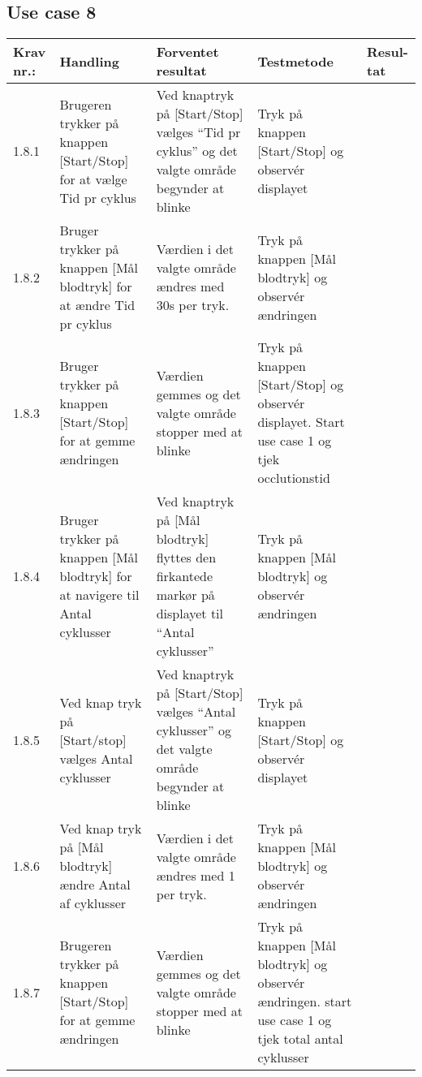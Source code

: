 \documentclass[11pt]{article}
\begin{document}
					\subsection{Use case 8}
					\begin{center}
						\begin{longtable}{|p{1.5cm}|p{2cm}|p{3cm}|p{3cm}|p{1.1cm}|}
							\hline
							Krav nr.: & Handling & Forventet resultat & Testmetode & Resul-tat  \\\hline
							1.8.1 & Brugeren trykker på knappen [Start/Stop] for at vælge Tid pr cyklus & Ved knaptryk på [Start/Stop] vælges “Tid pr cyklus” og det valgte område begynder at blinke & Tryk på knappen [Start/Stop] og observér displayet & \\ \hline
							1.8.2 & Bruger trykker på knappen [Mål blodtryk] for at ændre Tid pr cyklus & Værdien i det valgte område ændres med 30s per tryk. & Tryk på knappen [Mål blodtryk] og observér ændringen  & \\ \hline
							1.8.3 & Bruger trykker på knappen [Start/Stop] for at gemme ændringen & Værdien gemmes og det valgte område stopper med at blinke & Tryk på knappen [Start/Stop] og observér displayet. Start use case 1 og tjek occlutionstid & \\ \hline
							1.8.4 & Bruger trykker på knappen [Mål blodtryk] for at navigere til Antal cyklusser & Ved knaptryk på [Mål blodtryk] flyttes den firkantede markør på displayet til “Antal cyklusser” & Tryk på knappen [Mål blodtryk] og observér ændringen  & \\ \hline
							1.8.5 & Ved knap tryk på [Start/stop] vælges Antal cyklusser & Ved knaptryk på [Start/Stop] vælges “Antal cyklusser” og det valgte område begynder at blinke & Tryk på knappen [Start/Stop] og observér displayet & \\ \hline
							1.8.6 & Ved knap tryk på [Mål blodtryk] ændre Antal af cyklusser & Værdien i det valgte område ændres med 1 per tryk. & Tryk på knappen [Mål blodtryk] og observér ændringen & \\ \hline
							1.8.7 & Brugeren trykker på knappen [Start/Stop] for at gemme ændringen & Værdien gemmes og det valgte område stopper med at blinke & Tryk på knappen [Mål blodtryk] og observér ændringen.
							start use case 1 og tjek total antal cyklusser & \\ \hline
						\end{longtable}
					\end{center}
					
		
		
\end{document}
